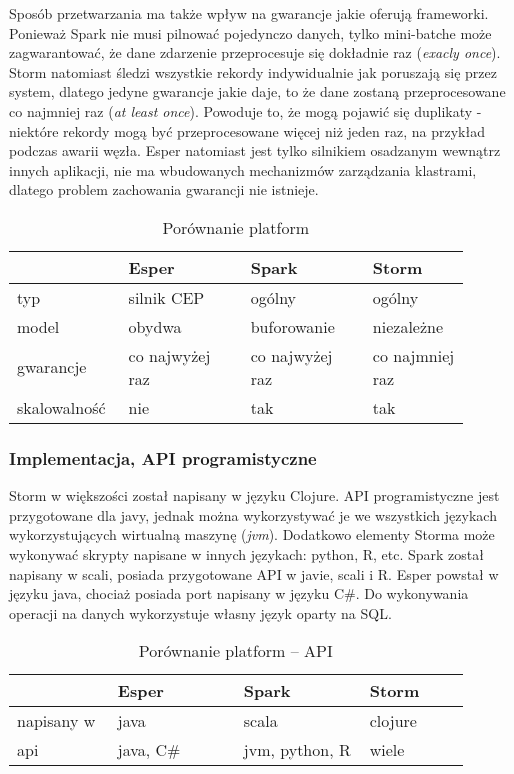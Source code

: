 Sposób przetwarzania ma także wpływ na gwarancje jakie oferują frameworki.
Ponieważ Spark nie musi pilnować pojedynczo danych,
tylko mini-batche może zagwarantować,
że dane zdarzenie przeprocesuje się dokładnie raz (\textit{exacly once}).
Storm natomiast śledzi wszystkie rekordy indywidualnie jak poruszają się przez system,
dlatego jedyne gwarancje jakie daje,
to że dane zostaną przeprocesowane co najmniej raz (\textit{at least once}).
Powoduje to, że mogą pojawić się duplikaty - niektóre rekordy mogą być przeprocesowane więcej niż jeden raz,
na przykład podczas awarii węzła.
Esper natomiast jest tylko silnikiem osadzanym wewnątrz innych aplikacji,
nie ma wbudowanych mechanizmów zarządzania klastrami,
dlatego problem zachowania gwarancji nie istnieje.
\begin{table}[h]
  \label{tab:ModelComparison}
  \begin{tabular}{p{0.2\linewidth} | p{0.25\linewidth} | p{0.25\linewidth} | p{0.2\linewidth}}
    & Esper & Spark & Storm \\
    \hline
    typ & silnik CEP & ogólny & ogólny \\
    \hline
    model & obydwa & buforowanie & niezależne \\
    \hline
    gwarancje & co najwyżej raz & co najwyżej raz & co najmniej raz \\
    \hline
    skalowalność & nie & tak & tak \\
  \end{tabular}
  \caption{Porównanie platform}
\end{table}

\subsubsection*{Implementacja, API programistyczne}
Storm w większości został napisany w języku Clojure.
API programistyczne jest przygotowane dla javy,
jednak można wykorzystywać je we wszystkich językach wykorzystujących wirtualną maszynę (\textit{jvm}).
Dodatkowo elementy Storma może wykonywać skrypty napisane w innych językach: python, R, etc.
Spark został napisany w scali,
posiada przygotowane API w javie, scali i R.
Esper powstał w języku java, chociaż posiada port napisany w języku C\#.
Do wykonywania operacji na danych wykorzystuje własny język oparty na SQL.
\begin{table}[h]
  \label{tab:ProgrammingApi}
  \begin{tabular}{p{0.2\linewidth} | p{0.25\linewidth} | p{0.25\linewidth} | p{0.2\linewidth}}
    & Esper & Spark & Storm \\
    \hline
    napisany w & java & scala & clojure \\
    \hline
    api & java, C\# & jvm, python, R & wiele \\
  \end{tabular}
  \caption{Porównanie platform -- API}
\end{table}


